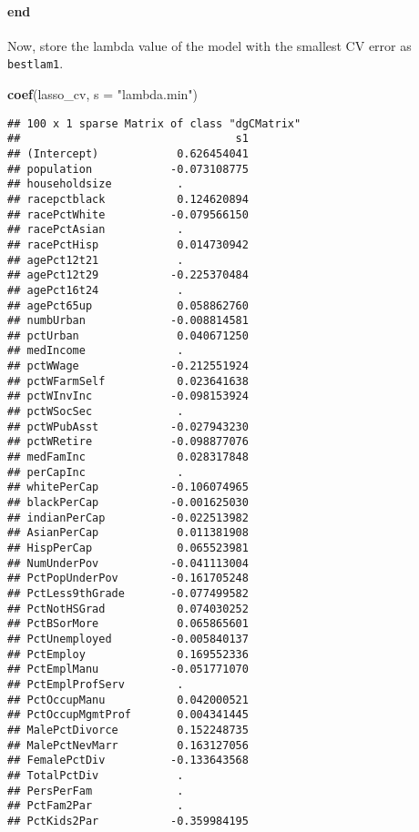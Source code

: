 \documentclass[
]{article}
\newenvironment{Shaded}{\begin{snugshade}}{\end{snugshade}}
\newcommand{\AttributeTok}[1]{\textcolor[rgb]{0.13,0.29,0.53}{#1}}
\newcommand{\FunctionTok}[1]{\textcolor[rgb]{0.13,0.29,0.53}{\textbf{#1}}}
\newcommand{\NormalTok}[1]{#1}
\newcommand{\StringTok}[1]{\textcolor[rgb]{0.31,0.60,0.02}{#1}}
\begin{document}
\hypertarget{end}{%
\paragraph{end}\label{end}}

Now, store the lambda value of the model with the smallest CV error as
\texttt{bestlam1}.

\begin{Shaded}
\begin{Highlighting}[]
\FunctionTok{coef}\NormalTok{(lasso\_cv, }\AttributeTok{s =} \StringTok{"lambda.min"}\NormalTok{)}
\end{Highlighting}
\end{Shaded}

\begin{verbatim}
## 100 x 1 sparse Matrix of class "dgCMatrix"
##                                 s1
## (Intercept)            0.626454041
## population            -0.073108775
## householdsize          .          
## racepctblack           0.124620894
## racePctWhite          -0.079566150
## racePctAsian           .          
## racePctHisp            0.014730942
## agePct12t21            .          
## agePct12t29           -0.225370484
## agePct16t24            .          
## agePct65up             0.058862760
## numbUrban             -0.008814581
## pctUrban               0.040671250
## medIncome              .          
## pctWWage              -0.212551924
## pctWFarmSelf           0.023641638
## pctWInvInc            -0.098153924
## pctWSocSec             .          
## pctWPubAsst           -0.027943230
## pctWRetire            -0.098877076
## medFamInc              0.028317848
## perCapInc              .          
## whitePerCap           -0.106074965
## blackPerCap           -0.001625030
## indianPerCap          -0.022513982
## AsianPerCap            0.011381908
## HispPerCap             0.065523981
## NumUnderPov           -0.041113004
## PctPopUnderPov        -0.161705248
## PctLess9thGrade       -0.077499582
## PctNotHSGrad           0.074030252
## PctBSorMore            0.065865601
## PctUnemployed         -0.005840137
## PctEmploy              0.169552336
## PctEmplManu           -0.051771070
## PctEmplProfServ        .          
## PctOccupManu           0.042000521
## PctOccupMgmtProf       0.004341445
## MalePctDivorce         0.152248735
## MalePctNevMarr         0.163127056
## FemalePctDiv          -0.133643568
## TotalPctDiv            .          
## PersPerFam             .          
## PctFam2Par             .          
## PctKids2Par           -0.359984195

\end{verbatim}
\end{document}
